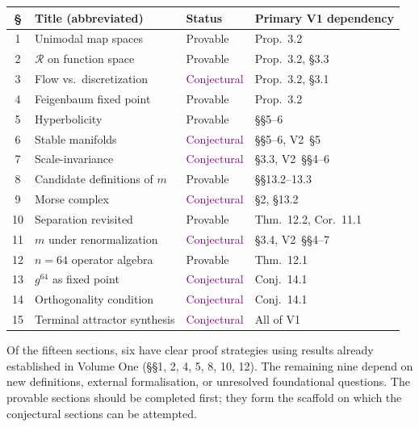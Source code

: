 \documentclass[11pt]{article}
\begin{document}
\medskip
\noindent
\begin{tabular}{clll}
\hline
\S & Title (abbreviated) & Status & Primary V1 dependency \\
\hline
1  & Unimodal map spaces          & \textcolor{blue!70!black}{Provable}     & Prop.~3.2 \\
2  & $\mathcal{R}$ on function space & \textcolor{blue!70!black}{Provable}  & Prop.~3.2, \S3.3 \\
3  & Flow vs.\ discretization     & \textcolor{purple}{Conjectural} & Prop.~3.2, \S3.1 \\
4  & Feigenbaum fixed point       & \textcolor{blue!70!black}{Provable}     & Prop.~3.2 \\
5  & Hyperbolicity                & \textcolor{blue!70!black}{Provable}     & \S\S5--6 \\
6  & Stable manifolds             & \textcolor{purple}{Conjectural} & \S\S5--6, V2~\S5 \\
7  & Scale-invariance             & \textcolor{purple}{Conjectural} & \S3.3, V2~\S\S4--6 \\
8  & Candidate definitions of $m$ & \textcolor{blue!70!black}{Provable}     & \S\S13.2--13.3 \\
9  & Morse complex                & \textcolor{purple}{Conjectural} & \S2, \S13.2 \\
10 & Separation revisited         & \textcolor{blue!70!black}{Provable}     & Thm.~12.2, Cor.~11.1 \\
11 & $m$ under renormalization    & \textcolor{purple}{Conjectural} & \S3.4, V2~\S\S4--7 \\
12 & $n=64$ operator algebra      & \textcolor{blue!70!black}{Provable}     & Thm.~12.1 \\
13 & $g^{64}$ as fixed point      & \textcolor{purple}{Conjectural} & Conj.~14.1 \\
14 & Orthogonality condition      & \textcolor{purple}{Conjectural} & Conj.~14.1 \\
15 & Terminal attractor synthesis & \textcolor{purple}{Conjectural} & All of V1 \\
\hline
\end{tabular}

\medskip
\noindent
Of the fifteen sections, six have clear proof strategies using results
already established in Volume One (\S\S1, 2, 4, 5, 8, 10, 12). The
remaining nine depend on new definitions, external formalisation, or
unresolved foundational questions. The provable sections should be
completed first; they form the scaffold on which the conjectural sections
can be attempted.
\end{document}
